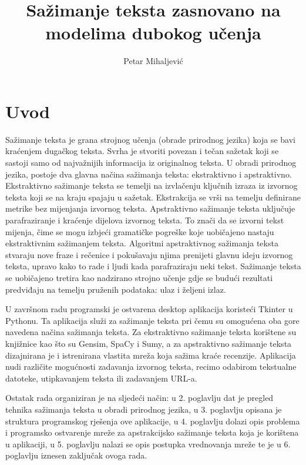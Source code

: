 \documentclass[times, utf8, zavrsni, numeric]{fer}
\begin{document}

\title{Sažimanje teksta zasnovano na modelima dubokog učenja}

\author{Petar Mihaljević}



\zahvala{}

\tableofcontents

\chapter{Uvod}
Sažimanje teksta je grana strojnog učenja (obrade prirodnog jezika) koja se bavi kraćenjem dugačkog teksta. Svrha je stvoriti povezan i tečan sažetak koji se sastoji samo od najvažnijih informacija iz originalnog teksta.
U obradi prirodnog jezika, postoje dva glavna načina sažimanja teksta: ekstraktivno i apstraktivno.
Ekstraktivno sažimanje teksta se temelji na izvlačenju ključnih izraza iz izvornog teksta koji se na kraju spajaju u sažetak. Ekstrakcija se vrši na temelju definirane metrike bez mijenjanja izvornog teksta.
Apstraktivno sažimanje teksta uključuje parafraziranje i kraćenje dijelova izvornog teksta. To znači da se izvorni tekst mijenja, čime se mogu izbjeći gramatičke pogreške koje uobičajeno nastaju ekstraktivnim sažimanjem teksta.
Algoritmi apstraktivnog sažimanja teksta stvaraju nove fraze i rečenice i pokušavaju njima prenijeti glavnu ideju izvornog teksta, upravo kako to rade i ljudi kada parafraziraju neki tekst.
Sažimanje teksta se uobičajeno tretira kao nadzirano strojno učenje gdje se budući rezultati predviđaju na temelju pruženih podataka: ulaz i željeni izlaz.
\par
U završnom radu programski je ostvarena desktop aplikacija koristeći Tkinter u Pythonu.
Ta aplikacija služi za sažimanje teksta pri čemu su omogućena oba gore navedena načina sažimanja teksta.
Za ekstraktivno sažimanje teksta korištene su knjižnice kao što su Gensim, SpaCy i Sumy, a za apstraktivno sažimanje teksta dizajnirana je i istrenirana vlastita mreža koja sažima kraće recenzije.
Aplikacija nudi različite mogućnosti zadavanja izvornog teksta, recimo odabirom tekstualne datoteke, utipkavanjem teksta ili zadavanjem URL-a.
\par
Ostatak rada organiziran je na sljedeći način: u 2. poglavlju dat je pregled tehnika sažimanja teksta u obradi prirodnog jezika,
u 3. poglavlju opisana je struktura programskog rješenja ove aplikacije,
u 4. poglavlju dolazi opis problema i programsko ostvarenje mreže za apstrakcijsko sažimanje teksta koja je korištena u aplikaciji,
u 5. poglavlju nalazi se opis postupka vrednovanja mreže te je
u 6. poglavlju iznesen zaključak ovoga rada.
\end{document}
